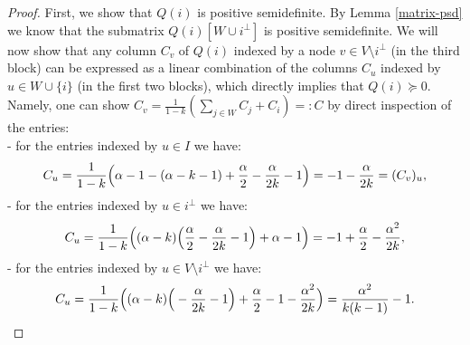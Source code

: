 \documentclass[11pt]{article}
\numberwithin{equation}{section}
\begin{document}
\begin{proof}
 First, we show that $Q(i)$ is positive semidefinite. By Lemma \ref{matrix-psd} we know
that the submatrix $Q(i)[W\cup i^\perp]$ is positive semidefinite. 
We will now show that any column $C_v$ of $Q(i)$ indexed by a node $v\in V\setminus i^\perp$ (in the third block) can be expressed as a linear combination of the columns $C_u$ indexed by $u\in W\cup \{i\}$ (in the first two blocks), which directly implies that $Q(i)\succeq 0$. Namely, one can show  $C_v= \frac{1}{1-k}(\sum_{j\in W} C_j +C_i)=:C$ by direct inspection of the entries:\\
- for the entries  indexed by $u\in I$ we have:
$$
C_u= {1\over 1-k} \Big(\alpha-1-(\alpha-k-1)+{\alpha\over 2}-{\alpha\over 2k}-1\Big) = -1-{\alpha\over 2k}= (C_v)_u,
$$
- for the entries indexed by $u\in i^\perp$ we have:
$$C_u= {1\over 1-k}\Big( (\alpha-k)\Big({\alpha\over 2}-{\alpha\over 2k}-1\Big)+\alpha -1\Big) = -1+{\alpha\over 2}-{\alpha^2\over 2k},$$
- for the entries indexed by $u\in V\setminus i^\perp$ we have:
$$C_u= {1\over 1-k}\Big( (\alpha-k)\Big(-{\alpha\over 2k}-1\Big) +{\alpha\over 2}-1-{\alpha^2\over 2k}\Big) = {\alpha^2\over k(k-1)}-1.$$


\end{proof}
\end{document}
